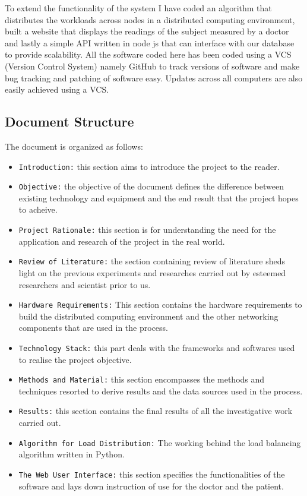 \documentclass[12pt]{article}
\begin{document}
To extend the functionality of the system I have coded an algorithm that distributes the workloads across nodes in a distributed computing environment, built a website that displays the readings of the subject measured by a doctor and lastly a simple API written in node js that can interface with our database to provide scalability. All the software coded here has been coded using a VCS (Version Control System) namely GitHub to track versions of software and make bug tracking and patching of software easy. Updates across all computers are also easily achieved using a VCS.

\subsection{Document Structure}
The document is organized as follows:
\begin{itemize}
\item \texttt{Introduction:} this section aims to introduce the project to the reader.
\item \texttt{Objective:} the objective of the document defines the difference between existing technology and equipment and the end result that the project hopes to acheive.
\item \texttt{Project Rationale:} this section is for understanding the need for the application and research of the project in the real world.
\item \texttt{Review of Literature:} the section containing review of literature sheds light on the previous experiments and researches carried out by esteemed researchers and scientist prior to us.
\item \texttt{Hardware Requirements:} This section contains the hardware requirements to build the distributed computing environment and the other networking components that are used in the process.
\item \texttt{Technology Stack:} this part deals with the frameworks and softwares used to realise the project objective.
\item \texttt{Methods and Material:} this section encompasses the methods and techniques resorted to derive results and the data sources used in the process.
\item \texttt{Results:} this section contains the final results of all the investigative work carried out.
\item \texttt{Algorithm for Load Distribution:} The working behind the load balancing algorithm written in Python.
\item \texttt{The Web User Interface:} this section specifies the functionalities of the software and lays down instruction of use for the doctor and the patient.

\end{itemize}
\end{document}
